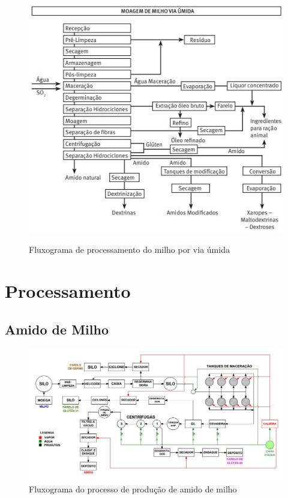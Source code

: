 \documentclass[
	12pt,				%
	openright,			%
	oneside,			%
	a4paper,			%
	english,			%
	french,				%
	spanish,			%
	brazil				%
	]{abntex2}
\begin{document}
\begin{figure}[H]
\begin{center}
\caption{Fluxograma de processamento do milho por via úmida}
\includegraphics[scale=0.55]{Imagens/WhatsApp Image 2022-10-09 at 14.41.43.jpeg} 
\label{2}
\end{center}
\end{figure}

\chapter{Processamento}
\section{Amido de Milho}


\begin{figure}[H]
\begin{center}
\caption{Fluxograma do processo de produção de amido de milho}
\includegraphics[scale=0.4]{Imagens/WhatsApp Image 2022-10-09 at 14.21.26.jpeg} 
\end{center}
\end{figure}
\end{document}

